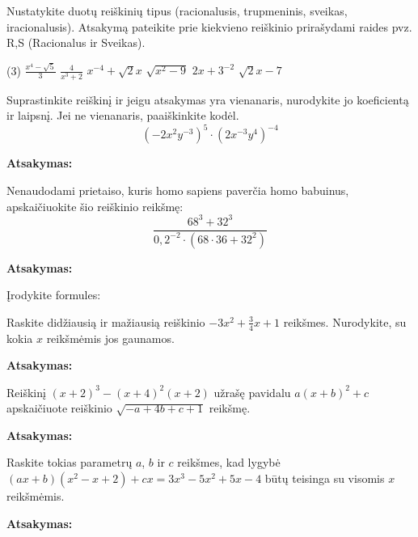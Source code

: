 \documentclass[12pt]{exam}
\newcommand{\atsakymas}{%
    \par\vspace{0.3cm}
    \textbf{Atsakymas:} \framebox[7cm]{\rule{0pt}{0.7cm}}
}
\begin{document}
\begin{questions}

\question[3] Nustatykite duotų reiškinių tipus (racionalusis, trupmeninis, sveikas, iracionalusis). Atsakymą pateikite prie kiekvieno reiškinio prirašydami raides pvz. R,S (Racionalus ir Sveikas).
\begin{tasks}[label-width=1.2em](3)
    \task $\displaystyle \frac{x^4 - \sqrt{5}}{3}$
    \task $\displaystyle \frac{4}{x^3 + 2}$
    \task $\displaystyle x^{-4} + \sqrt{2} x$
    \task $\displaystyle \sqrt{x^2 - 9}$
    \task $\displaystyle 2x+3 ^{-2} $
    \task $\displaystyle \sqrt{2}x-7 $
\end{tasks}
\droppoints

\question[4] Suprastinkite reiškinį ir jeigu atsakymas yra vienanaris, nurodykite jo koeficientą ir laipsnį. Jei ne vienanaris, paaiškinkite kodėl.
$$ \left( -2x^2y^{-3} \right)^5 \cdot \left( 2x^{-3}y^4 \right)^{-4} $$
\droppoints
\vspace{2.5cm}
\atsakymas

\question[4] Nenaudodami prietaiso, kuris homo sapiens paverčia homo babuinus, apskaičiuokite šio reiškinio reikšmę:
 $$\displaystyle \frac{68^3 + 32^3}{0,2 ^{-2} \cdot (68 \cdot 36+32 ^{2} ) } $$ \droppoints
\vspace{3.5cm}
\atsakymas

\question Įrodykite formules:
\newpage

\question[4] Raskite didžiausią ir mažiausią reiškinio $-3x^2 + \frac{3}{4} x + 1$ reikšmes. Nurodykite, su kokia $x$ reikšmėmis jos gaunamos.
\droppoints
\vspace{3.5cm}
\atsakymas

\question[5]  Reiškinį $(x+2) ^{3} -(x+4) ^{2} (x+2)$ užrašę pavidalu $a(x+b)^{2} + c$ apskaičiuote reiškinio $\sqrt{-a+4b+c+1} $ reikšmę.   
\droppoints
\vspace{3.5cm}
\atsakymas

\question[4] Raskite tokias parametrų $a$, $b$ ir $c$ reikšmes, kad lygybė $(ax+b)(x^2-x+2) + cx = 3x^3-5x^2+5x-4$ būtų teisinga su visomis $x$ reikšmėmis.
\droppoints
\vspace{4.5cm}
\atsakymas

\end{questions}
\end{document}
